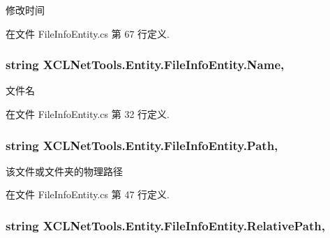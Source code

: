 修改时间 



在文件 File\-Info\-Entity.\-cs 第 67 行定义.

\hypertarget{class_x_c_l_net_tools_1_1_entity_1_1_file_info_entity_a15a2bb6c738c32250f00604b6636cae4}{
\subsubsection[{Name}]{\setlength{\rightskip}{0pt plus 5cm}string X\-C\-L\-Net\-Tools.\-Entity.\-File\-Info\-Entity.\-Name\hspace{0.3cm}{\ttfamily [get]}, {\ttfamily [set]}}}\label{class_x_c_l_net_tools_1_1_entity_1_1_file_info_entity_a15a2bb6c738c32250f00604b6636cae4}


文件名 



在文件 File\-Info\-Entity.\-cs 第 32 行定义.

\hypertarget{class_x_c_l_net_tools_1_1_entity_1_1_file_info_entity_a67f485c1a1af6205351305756d515e98}{
\subsubsection[{Path}]{\setlength{\rightskip}{0pt plus 5cm}string X\-C\-L\-Net\-Tools.\-Entity.\-File\-Info\-Entity.\-Path\hspace{0.3cm}{\ttfamily [get]}, {\ttfamily [set]}}}\label{class_x_c_l_net_tools_1_1_entity_1_1_file_info_entity_a67f485c1a1af6205351305756d515e98}


该文件或文件夹的物理路径 



在文件 File\-Info\-Entity.\-cs 第 47 行定义.

\hypertarget{class_x_c_l_net_tools_1_1_entity_1_1_file_info_entity_a795982d186fa2d1ef0e3fb51705f36b2}{
\subsubsection[{Relative\-Path}]{\setlength{\rightskip}{0pt plus 5cm}string X\-C\-L\-Net\-Tools.\-Entity.\-File\-Info\-Entity.\-Relative\-Path\hspace{0.3cm}{\ttfamily [get]}, {\ttfamily [set]}}}\label{class_x_c_l_net_tools_1_1_entity_1_1_file_info_entity_a795982d186fa2d1ef0e3fb51705f36b2}


